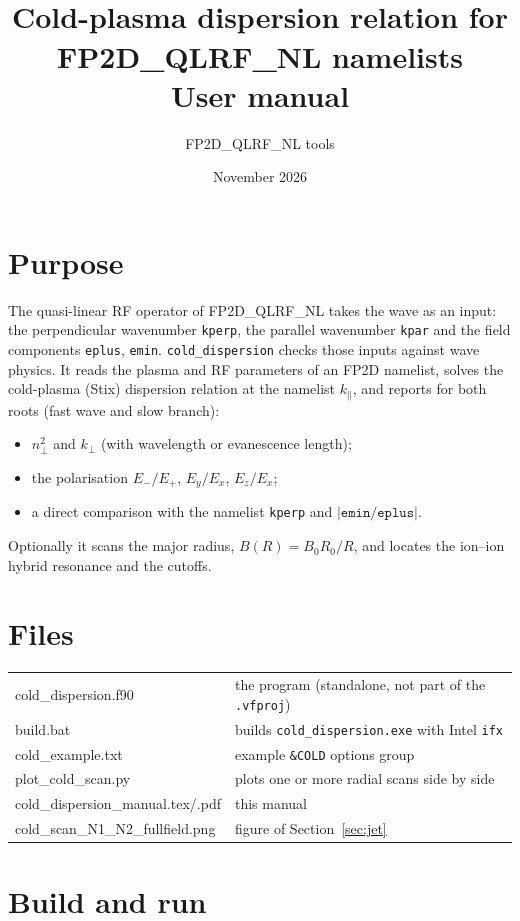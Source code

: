 \documentclass[11pt,a4paper]{article}
\title{\code{cold\_dispersion}\\[2pt]
  \large Cold-plasma dispersion relation for FP2D\_QLRF\_NL namelists\\
  User manual}
\author{FP2D\_QLRF\_NL tools}
\date{November 2026}
\newcommand{\nperp}{n_\perp}
\newcommand{\code}[1]{\texttt{#1}}
\begin{document}
\maketitle

\section{Purpose}

The quasi-linear RF operator of FP2D\_QLRF\_NL takes the wave as an input:
the perpendicular wavenumber \code{kperp}, the parallel wavenumber \code{kpar}
and the field components \code{eplus}, \code{emin}. \code{cold\_dispersion}
checks those inputs against wave physics. It reads the plasma and RF
parameters of an FP2D namelist, solves the cold-plasma (Stix) dispersion
relation at the namelist $k_\parallel$, and reports for both roots
(fast wave and slow branch):
\begin{itemize}[nosep]
  \item $\nperp^2$ and $k_\perp$ (with wavelength or evanescence length);
  \item the polarisation $E_-/E_+$, $E_y/E_x$, $E_z/E_x$;
  \item a direct comparison with the namelist \code{kperp} and $|\code{emin}/\code{eplus}|$.
\end{itemize}
Optionally it scans the major radius, $B(R)=B_0R_0/R$, and locates the
ion--ion hybrid resonance and the cutoffs.

\section{Files}

\begin{tabular}{@{}>{\ttfamily}l l@{}}
\toprule
cold\_dispersion.f90 & the program (standalone, not part of the \code{.vfproj}) \\
build.bat            & builds \code{cold\_dispersion.exe} with Intel \code{ifx} \\
cold\_example.txt    & example \code{\&COLD} options group \\
plot\_cold\_scan.py  & plots one or more radial scans side by side \\
cold\_dispersion\_manual.tex/.pdf & this manual \\
cold\_scan\_N1\_N2\_fullfield.png & figure of Section~\ref{sec:jet} \\
\bottomrule
\end{tabular}

\section{Build and run}
\end{document}
